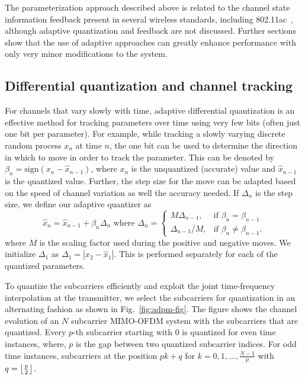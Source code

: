 \documentclass[journal,10pt,twocolumn]{IEEEtran}
\DeclarePairedDelimiter\floor{\lfloor}{\rfloor}
\begin{document}
The parameterization approach described above is related to the channel
state information feedback present in several wireless standards,
including 802.11ac~\cite{lou2013comparison}, although adaptive
quantization and feedback are not discussed. Further
sections show that the use of adaptive approaches can greatly enhance
performance with only very minor modifications to the system.
\subsection{Differential quantization and channel tracking}
\label{quantiz}
For channels that vary slowly with time, adaptive differential
quantization is an effective method for tracking parameters over time
using very few bits (often just one bit per parameter). For example,
while tracking a slowly varying discrete random process $x_n$ at time
$n$, the one bit can be used to determine the direction in which to
move in order to track the parameter. This can be denoted by
$\beta_{n} = \mbox{sign}(x_{n} - \hat{x}_{n-1})$, where $x_n$ is the
unquantized (accurate) value and $\hat{x}_{n-1}$ is the quantized
value. Further, the step size for the move can be adapted based on the
speed of channel variation as well the accuracy needed. If $\Delta_n$
is the step size, we define our adaptive quantizer as
\begin{equation}
\hat{x}_{n} = \hat{x}_{n-1} + \beta_{n}\Delta_{n} \mbox{ where }
\label{delta_eqn}
\Delta_{n} = \begin{cases}
    M \Delta_{n-1}, & \text{if $\beta_{n} = \beta_{n-1}$}\\
    \Delta_{n-1}/M , & \text{if $\beta_{n} \neq \beta_{n-1}$}.
  \end{cases}
\end{equation}
where $M$ is the scaling factor used during the positive and negative
moves. We initialize $\Delta_1$ as $\Delta_1 = |x_{2}-\hat{x}_1|$. This is performed separately for each of the quantized
parameters.

To quantize the subcarriers efficiently and exploit the joint
time-frequency interpolation at the transmitter, we select the
subcarriers for quantization in an alternating fashion as shown in
Fig.~\ref{fig:adpm-fig}. The figure shows the channel evolution of an
$N$ subcarrier MIMO-OFDM system with the subcarriers that are
quantized. Every $p$-th subcarrier starting with $0$ is quantized for
even time instances, where, $p$ is the gap between two quantized
subcarrier indices. For odd time instances, subcarriers at the
position $pk+q$ for $k = 0,1,..., \frac{N-1}{p}$ with $q =
{\floor*{\frac{p}{2}}}$.
\end{document}
